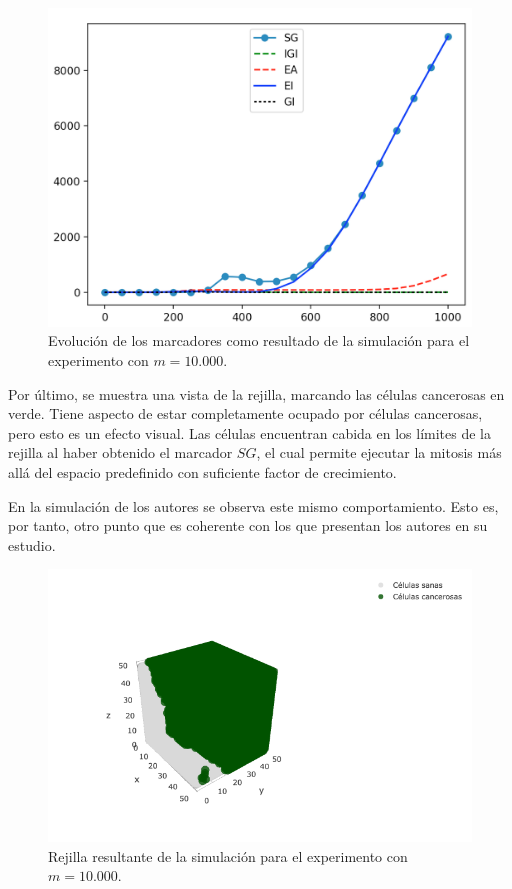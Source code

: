 \begin{figure}[h]
\centering
\includegraphics[scale=0.6]{figures/experiments/exp1/mutations}
\caption{Evolución de los marcadores como resultado de la simulación para el experimento con $m = 10.000$.}
\end{figure}

Por último, se muestra una vista de la rejilla, marcando las células cancerosas en verde. Tiene aspecto de estar completamente
ocupado por células cancerosas, pero esto es un efecto visual. Las células encuentran cabida en los límites de la rejilla
al haber obtenido el marcador $SG$, el cual permite ejecutar la mitosis más allá del espacio predefinido con suficiente
factor de crecimiento.

En la simulación de los autores se observa este mismo comportamiento. Esto es, por tanto, otro punto que es coherente con
los que presentan los autores en su estudio.

\begin{figure}[h]
\centering
\includegraphics[scale=0.6]{figures/experiments/exp1/grid}
\caption{Rejilla resultante de la simulación para el experimento con $m = 10.000$.}
\end{figure}

